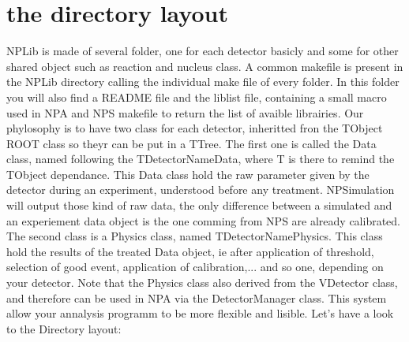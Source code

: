 \documentclass{book}
\begin{document}
	\section{the directory layout}
		NPLib is made of several folder, one for each detector basicly and some for other shared object such as reaction and nucleus class. A common makefile is present in the NPLib directory calling the individual make file of every folder. In this folder you will also find a README file and the liblist file, containing a small macro used in NPA and NPS makefile to return the list of avaible librairies. Our phylosophy is to have two class for each detector, inheritted fron the TObject ROOT class so theyr can be put in a TTree. The first one is called the Data class, named following the TDetectorNameData, where T is there to remind the TObject dependance. This Data class hold the raw parameter given by the detector during an experiment, understood before any treatment. NPSimulation will output those kind of raw data, the only difference between a simulated and an experiement data object is the one comming from NPS are already calibrated. The second class is a Physics class, named TDetectorNamePhysics. This class hold the results of the treated Data object, ie after application of threshold, selection of good event, application of calibration,... and so one, depending on your detector. Note that the Physics class also derived from the VDetector class, and therefore can be used in NPA via the DetectorManager class. This system allow your annalysis programm to be more flexible and lisible. Let's have a look to the Directory layout:
		
\end{document}
